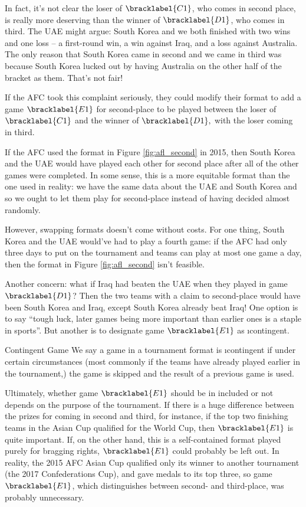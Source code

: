 {    In fact, it's not clear the loser of $\bracklabel{C1}$, who comes in second place, is really more deserving than the winner of $\bracklabel{D1}$, who comes in third. The UAE might argue: South Korea and we both finished with two wins and one loss -- a first-round win, a win against Iraq, and a loss against Australia. The only reason that South Korea came in second and we came in third was because South Korea lucked out by having Australia on the other half of the bracket as them. That's not fair!

    If the AFC took this complaint seriously, they could modify their format to add a game $\bracklabel{E1}$ for second-place to be played between the loser of $\bracklabel{C1}$ and the winner of $\bracklabel{D1},$ with the loser coming in third.


    If the AFC used the format in Figure \ref{fig:afl_second} in 2015, then South Korea and the UAE would have played each other for second place after all of the other games were completed. In some sense, this is a more equitable format than the one used in reality: we have the same data about the UAE and South Korea and so we ought to let them play for second-place instead of having decided almost randomly.

    However, swapping formats doesn't come without costs. For one thing, South Korea and the UAE would've had to play a fourth game: if the AFC had only three days to put on the tournament and teams can play at most one game a day, then the format in Figure \ref{fig:afl_second} isn't feasible.

    Another concern: what if Iraq had beaten the UAE when they played in game $\bracklabel{D1}$? Then the two teams with a claim to second-place would have been South Korea and Iraq, except South Korea already beat Iraq! One option is to say ``tough luck, later games being more important than earlier ones is a staple in sports''. But another is to designate game $\bracklabel{E1}$ as \i{contingent}.

    \begin{definition}{Contingent Game}{}
        We say a game in a tournament format is \i{contingent} if under certain circumstances (most commonly if the teams have already played earlier in the tournament,) the game is skipped and the result of a previous game is used.
    \end{definition}

    Ultimately, whether game $\bracklabel{E1}$ should be in included or not depends on the purpose of the tournament. If there is a huge difference between the prizes for coming in second and third, for instance, if the top two finishing teams in the Asian Cup qualified for the World Cup, then $\bracklabel{E1}$ is quite important. If, on the other hand, this is a self-contained format played purely for bragging rights, $\bracklabel{E1}$ could probably be left out. In reality, the 2015 AFC Asian Cup qualified only its winner to another tournament (the 2017 Confederations Cup), and gave medals to its top three, so game $\bracklabel{E1}$, which distinguishes between second- and third-place, was probably unnecessary.

}
